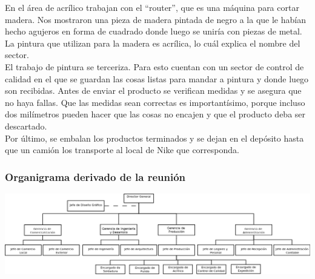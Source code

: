 \documentclass[a4paper,10pt,titlepage]{article}
\begin{document}
En el \'area de acr\'ilico trabajan con el ``router'', que es una m\'aquina para cortar madera. Nos mostraron una pieza de madera pintada de negro a la que le hab\'ian hecho agujeros en forma de cuadrado
donde luego se unir\'ia con piezas de metal. La pintura que utilizan para la madera es acr\'ilica, lo cu\'al explica el nombre del sector.\\ 
El trabajo de pintura se terceriza. Para esto cuentan con un sector de control de calidad en el que se guardan las cosas listas para mandar a pintura y donde luego son recibidas.
Antes de enviar el producto se verifican medidas y se asegura que no haya fallas. Que las medidas sean correctas es important\'isimo, porque incluso 
dos milímetros pueden hacer que las cosas no encajen y que el producto deba ser descartado. \\
Por \'ultimo, se embalan los productos terminados y se dejan en el dep\'osito hasta que un cami\'on los transporte al local de Nike que corresponda.



\subsubsection*{\textbf{Organigrama derivado de la reuni\'on}}
\begin{center}
\includegraphics[angle=90,scale=0.45]{./Organigramas/IcomOrganigramaNuestro4.png}
\end{center}

\newpage
\end{document}
